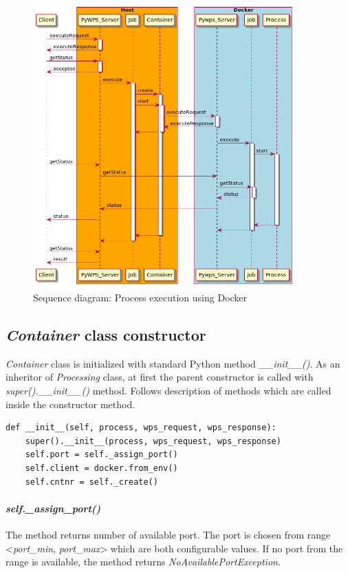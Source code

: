\documentclass[12pt,a4paper]{article}
\begin{document}
\bigskip
\begin{figure}[h!]
\centering
\includegraphics[width=0.9\textwidth]{img/Diag_sequence.png}
\caption{Sequence diagram: Process execution using Docker}
\label{fig:Diag_sequence}
\end{figure}

\subsection{\textit{Container} class constructor}
\textit{Container} class is initialized with standard Python method \textit{\_\_init\_\_()}. As an inheritor of \textit{Processing}
class, at first the parent constructor is called with \textit{super().\_\_init\_\_()} method. Follows description of methods which are
called inside the constructor method.

\bigskip
\begin{lstlisting}[basicstyle=\small,caption={\textit{Container} class constructor},label={lst:Container_constructor}]
def __init__(self, process, wps_request, wps_response):
    super().__init__(process, wps_request, wps_response)
    self.port = self._assign_port()
    self.client = docker.from_env()
    self.cntnr = self._create()
\end{lstlisting}

\paragraph{\textit{self.\_assign\_port()}} The method returns number of available port. The port is chosen from range <\textit{port\_min},
\textit{port\_max}> which are both configurable values. If no port from the range is available, the method returns
\textit{NoAvailablePortException}. 
\end{document}
